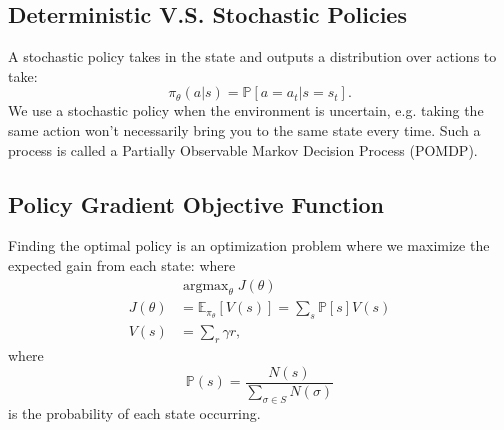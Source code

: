 \documentclass[12pt]{article}
\theoremstyle{plain}
\theoremstyle{definition}
\theoremstyle{remark}
\newcommand{\hE}{\mathbb E}
\newcommand{\hP}{\mathbb P}
\DeclareMathOperator{\argmax}{argmax}
\begin{document}
\subsection{Deterministic V.S. Stochastic Policies}

A stochastic policy takes in the state and outputs a distribution over actions to take: $$
  \pi_\theta(a|s) = \hP[a = a_t | s = s_t].
$$ We use a stochastic policy when the environment is uncertain, e.g. taking the same action won't necessarily bring you to the same state every time. Such a process is called a Partially Observable Markov Decision Process (POMDP).

\subsection{Policy Gradient Objective Function}

Finding the optimal policy is an optimization problem where we maximize the expected gain from each state:
where
\begin{align*}
& \argmax_\theta  J(\theta) \\
J(\theta) &= \hE_{\pi_\theta}[V(s)] = \sum_s \hP[s] V(s) \\
V(s) &= \sum_r \gamma r,
\end{align*}
where $$
  \hP(s) = \frac{N(s)}{\sum_{\sigma\in S} N(\sigma)}
$$
is the probability of each state occurring.
\end{document}

